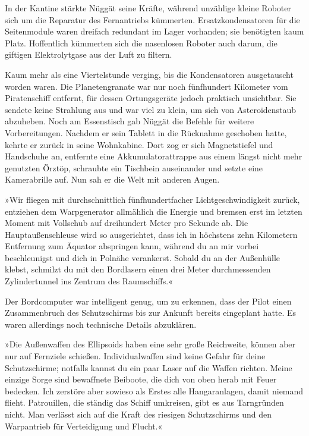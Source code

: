 In der Kantine stärkte Nüggät seine Kräfte, während unzählige kleine Roboter sich um die Reparatur des Fernantriebs kümmerten. Ersatzkondensatoren für die Seitenmodule waren dreifach redundant im Lager vorhanden; sie benötigten kaum Platz. Hoffentlich kümmerten sich die nasenlosen Roboter auch darum, die giftigen Elektrolytgase aus der Luft zu filtern.

Kaum mehr als eine Viertelstunde verging, bis die Kondensatoren ausgetauscht worden waren. Die Planetengranate war nur noch fünfhundert Kilometer vom Piratenschiff entfernt, für dessen Ortungsgeräte jedoch praktisch unsichtbar. Sie sendete keine Strahlung aus und war viel zu klein, um sich von Asteroidenstaub abzuheben. Noch am Essenstisch gab Nüggät die Befehle für weitere Vorbereitungen. Nachdem er sein Tablett in die Rücknahme geschoben hatte, kehrte er zurück in seine Wohnkabine. Dort zog er sich Magnetstiefel und Handschuhe an, entfernte eine Akkumulatorattrappe aus einem längst nicht mehr genutzten Örztöp, schraubte ein Tischbein auseinander und setzte eine Kamerabrille auf. Nun sah er die Welt mit anderen Augen.

»Wir fliegen mit durchschnittlich fünfhundertfacher Lichtgeschwindigkeit zurück, entziehen dem Warpgenerator allmählich die Energie und bremsen erst im letzten Moment mit Vollschub auf dreihundert Meter pro Sekunde ab. Die Hauptaußenschleuse wird so ausgerichtet, dass ich in höchstens zehn Kilometern Entfernung zum Äquator abspringen kann, während du an mir vorbei beschleunigst und dich in Polnähe verankerst. Sobald du an der Außenhülle klebst, schmilzt du mit den Bordlasern einen drei Meter durchmessenden Zylindertunnel ins Zentrum des Raumschiffs.«

Der Bordcomputer war intelligent genug, um zu erkennen, dass der Pilot einen Zusammenbruch des Schutzschirms bis zur Ankunft bereits eingeplant hatte. Es waren allerdings noch technische Details abzuklären. 

»Die Außenwaffen des Ellipsoids haben eine sehr große Reichweite, können aber nur auf Fernziele schießen. Individualwaffen sind keine Gefahr für deine Schutzschirme; notfalls kannst du ein paar Laser auf die Waffen richten. Meine einzige Sorge sind bewaffnete Beiboote, die dich von oben herab mit Feuer bedecken. Ich zerstöre aber sowieso als Erstes alle Hangaranlagen, damit niemand flieht. Patrouillen, die ständig das Schiff umkreisen, gibt es aus Tarngründen nicht. Man verlässt sich auf die Kraft des riesigen Schutzschirms und den Warpantrieb für Verteidigung und Flucht.«

